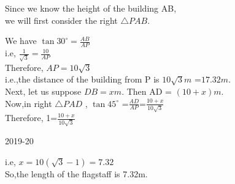 \documentclass[a4paper,12pt]{article}
\begin{document}
\vspace{-12em}
Since we know the height of the building AB,\\
we will first consider the right $  \triangle PAB. $ 
\begin{spacing}{2.5}
\noindent
We have 
\hspace{2em} 
$ \tan 30^\circ = \frac{AB}{AP}$ \\
i.e, \hspace{4em}
$ \frac{1}{\sqrt{3}} = \frac{10}{AP} $\\
Therefore,
\hspace{1em}
$ AP=10 \sqrt{3}$ \\
i.e.,the distance of the building from P is $ 10\sqrt{3}m $ =$17.32m $. \\
Next, let us suppose $DB = x m$. Then AD = $(10 + x) m.$ \\
Now,in right $\triangle PAD$ ,
\hspace{1em}
$\tan 45^\circ $ =$ \frac{AD}{AP}$=$\frac{10+x}{10\sqrt{3}}$ \\
Therefore,\hspace{6em} 1=$\frac{10+x}{10\sqrt{3}}$ \\
\end{spacing}
\begin{center}
\vspace{1em}
2019-20
\end{center}
\newpage
{}
\noindent i.e,\vspace{0.8em}
\hspace{4em} $x=10(\sqrt{3}-1)=7.32 $\\
\vspace{1em}
So,the length of the flagstaff is 7.32m.
\end{document}
